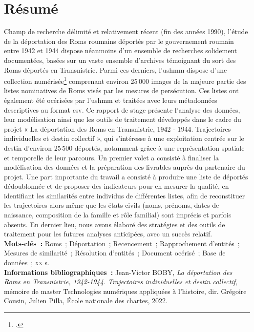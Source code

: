\documentclass[a4paper,12pt,twoside]{book}
\newcommand{\siecle}[1]{\textsc{#1}\ieme}
\begin{document}
	\chapter*{Résumé}
		Champ de recherche délimité et relativement récent (fin des années 1990), l'étude de la déportation des Roms roumains déportés par le gouvernement roumain entre 1942 et 1944 dispose néanmoins d'un ensemble de recherches solidement documentées, basées sur un vaste ensemble d'archives témoignant du sort des Roms déportés en Transnistrie. Parmi ces derniers, l'\gls{ushmm} dispose d'une collection numérisée\footcite{rg-25.050mSelectedRecordsVarious} comprenant environ 25\,000 images de la majeure partie des listes nominatives de Roms visés par les mesures de persécution. Ces listes ont également été océrisées par l'\gls{ushmm} et traitées avec leurs métadonnées descriptives au format \acrshort{csv}. Ce rapport de stage présente l'analyse des données, leur modélisation ainsi que les outils de traitement développés dans le cadre du projet « La déportation des Roms en Transnistrie, 1942 - 1944. Trajectoires individuelles et destin collectif », qui s’intéresse à une exploitation centrée sur le destin d'environ 25\,500 déportés, notamment grâce à une représentation spatiale et temporelle de leur parcours. Un premier volet a consisté à finaliser la modélisation des données et la préparation des livrables auprès du partenaire du projet. Une part importante du travail a consisté à produire une liste de déportés dédoublonnée et de proposer des indicateurs pour en mesurer la qualité, en identifiant les similarités entre individus de différentes listes, afin de reconstituer les trajectoires alors même que les états civils (noms, prénoms, dates de naissance, composition de la famille et rôle familial) sont imprécis et parfois absents. En dernier lieu, nous avons élaboré des stratégies et des outils de traitement pour les futures analyses anticipées, avec un succès relatif.\\
		
		\textbf{Mots-clés~:} Roms~; Déportation~; Recencement~; Rapprochement d’entités~; Mesures de similarité~; Résolution d’entités~; Document océrisé~; Base de données~; \siecle{xx} s.\\
		
		\textbf{Informations bibliographiques~:} Jean-Victor BOBY, \textit{La déportation des Roms en Transnistrie, 1942-1944. Trajectoires individuelles et destin collectif}, mémoire de master \og{}Technologies numériques appliquées à l'histoire\fg{}, dir. Grégoire Cousin, Julien Pilla, École nationale des chartes, 2022.
		
\end{document}
